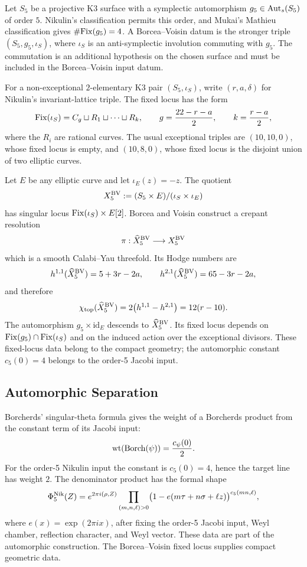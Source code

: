 Let \(S_5\) be a projective K3 surface with a symplectic automorphism
\(g_5\in\mathrm{Aut}_{s}(S_5)\) of order \(5\).  Nikulin's classification permits
this order, and Mukai's Mathieu classification gives
\(\#\mathrm{Fix}(g_5)=4\).  A Borcea--Voisin datum is the stronger triple
\((S_5,g_5,\iota_S)\), where \(\iota_S\) is an anti-symplectic
involution commuting with \(g_5\).  The commutation is an additional
hypothesis on the chosen surface and must be included in the
Borcea--Voisin input datum.

For a non-exceptional \(2\)-elementary K3 pair \((S_5,\iota_S)\), write
\((r,a,\delta)\) for Nikulin's invariant-lattice triple.  The fixed
locus has the form
\[
  \mathrm{Fix}(\iota_S)=C_g\sqcup R_1\sqcup\cdots\sqcup R_k,
  \qquad
  g=\frac{22-r-a}{2},\qquad
  k=\frac{r-a}{2},
\]
where the \(R_i\) are rational curves.  The usual exceptional triples
are \((10,10,0)\), whose fixed locus is empty, and \((10,8,0)\), whose
fixed locus is the disjoint union of two elliptic curves.

Let \(E\) be any elliptic curve and let \(\iota_E(z)=-z\).  The quotient
\[
  X_5^{\mathrm{BV}}:=(S_5\times E)/(\iota_S\times\iota_E)
\]
has singular locus \(\mathrm{Fix}(\iota_S)\times E[2]\).  Borcea and Voisin
construct a crepant resolution
\[
  \pi:\widehat X_5^{\mathrm{BV}}\longrightarrow X_5^{\mathrm{BV}}
\]
which is a smooth Calabi--Yau threefold.  Its Hodge numbers are
\[
  h^{1,1}(\widehat X_5^{\mathrm{BV}})=5+3r-2a,\qquad
  h^{2,1}(\widehat X_5^{\mathrm{BV}})=65-3r-2a,
\]
and therefore
\[
  \chi_{\mathrm{top}}(\widehat X_5^{\mathrm{BV}})
  =2\bigl(h^{1,1}-h^{2,1}\bigr)=12(r-10).
\]
The automorphism \(g_5\times\mathrm{id}_E\) descends to
\(\widehat X_5^{\mathrm{BV}}\).  Its fixed locus depends on
\(\mathrm{Fix}(g_5)\cap\mathrm{Fix}(\iota_S)\) and on the induced action over the
exceptional divisors.  These fixed-locus data belong to the compact
geometry; the automorphic constant \(c_5(0)=4\) belongs to the
order-5 Jacobi input.

\subsection*{Automorphic Separation}

Borcherds' singular-theta formula gives the weight of a Borcherds
product from the constant term of its Jacobi input:
\[
  \mathrm{wt}(\mathrm{Borch}(\psi))=\frac{c_\psi(0)}{2}.
\]
For the order-5 Nikulin input the constant is \(c_5(0)=4\), hence the
target line has weight \(2\).  The denominator product has the formal
shape
\[
  \Phi_{5}^{\mathrm{Nik}}(Z)=
  e^{2\pi i(\rho,Z)}
  \prod_{(m,n,\ell)>0}
  \bigl(1-e(m\tau+n\sigma+\ell z)\bigr)^{c_5(mn,\ell)},
\]
where \(e(x)=\exp(2\pi i x)\), after fixing the order-5 Jacobi input,
Weyl chamber, reflection character, and Weyl vector.  These data are
part of the automorphic construction.  The Borcea--Voisin fixed locus
supplies compact geometric data.


